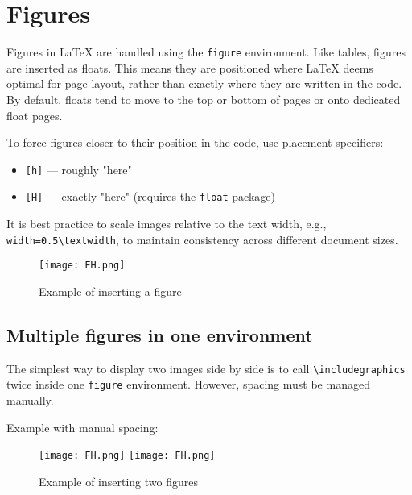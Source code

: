 \section{Figures}
    \label{sec:Figures}

    Figures in \LaTeX{} are handled using the \texttt{figure} environment. Like tables, figures are inserted as floats. This means they are positioned where \LaTeX{} deems optimal for page layout, rather than exactly where they are written in the code. By default, floats tend to move to the top or bottom of pages or onto dedicated float pages.

    To force figures closer to their position in the code, use placement specifiers:
    \begin{itemize}
        \item \texttt{[h]} — roughly "here"
        \item \texttt{[H]} — exactly "here" (requires the \texttt{float} package)
    \end{itemize}

    It is best practice to scale images relative to the text width, e.g.,\\ \verb|width=0.5\textwidth|, to maintain consistency across different document sizes.

    \begin{figure}[h]
    	\centering
    	\texttt{[image: FH.png]}
    	\caption{Example of inserting a figure}
    	\label{fig:ExampleFigure-1}
    \end{figure}

\subsection{Multiple figures in one environment}

    The simplest way to display two images side by side is to call \verb|\includegraphics| twice inside one \texttt{figure} environment. However, spacing must be managed manually.

    Example with manual spacing:

    \begin{figure}[h]
        \centering
        \texttt{[image: FH.png]}
        \hfil
        \texttt{[image: FH.png]}
        \caption{Example of inserting two figures}
        \label{fig:ExampleFigure-2}
    \end{figure}

